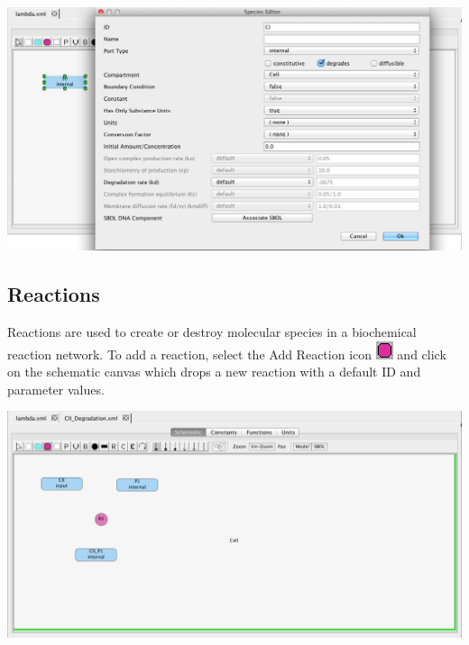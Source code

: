 \documentclass[titlepage,11pt]{article}
\begin{document}
\begin{center}
\includegraphics[width=160mm]{screenshots/species}
\end{center}

\clearpage

\subsection{\label{Reactions}Reactions}

\noindent
Reactions are used to create or destroy molecular species in a biochemical reaction network.  
To add a reaction, select the Add Reaction icon \includegraphics{../gui/icons/modelview/add_reaction_selected} and click on the schematic canvas which drops a new reaction with a default ID and parameter values.  

\begin{center}
\includegraphics[width=155mm]{screenshots/reaction}
\end{center}
\end{document}

